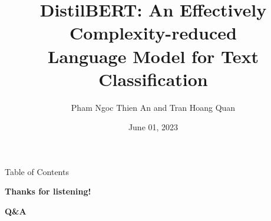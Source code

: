 \documentclass[10pt, aspectratio=149]{beamer}
\title[DistilBERT for Text Classification]{DistilBERT: An Effectively Complexity-reduced \\ Language Model for Text Classification}
\author[PNTAn and THQuan]{Pham Ngoc Thien An \inst{1,}\inst{2} and Tran Hoang Quan \inst{1,}\inst{2}}
\institute[fit@hcmus]{
\footnotemark[1]{Faculty of Information Technology, University of Science},

\footnotemark[2]{Vietnam National University, Ho Chi Minh City, Vietnam}
}
\date{June 01, 2023}
\begin{document}
\maketitle

\begin{frame}{Table of Contents}
\tableofcontents
\end{frame}









\begin{frame}[plain]
\centering
\Huge{\textbf{Thanks for listening!}}

\small{\textbf{Q\&A}}
\end{frame}
\end{document}
